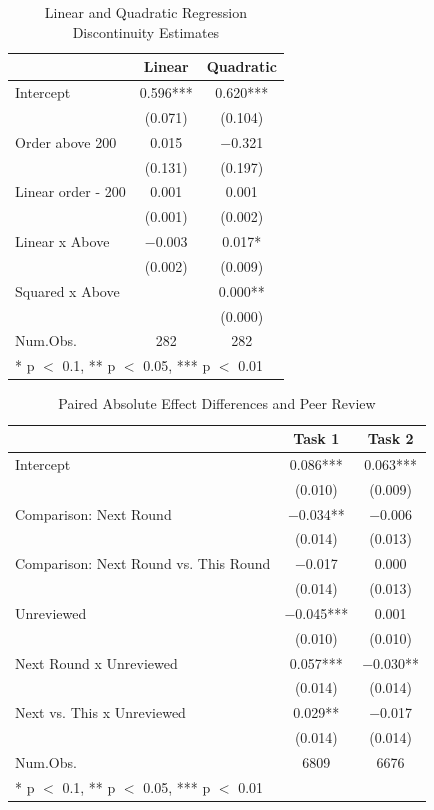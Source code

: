 \documentclass[
  letterpaper,
  DIV=11,
  numbers=noendperiod]{scrartcl}
\begin{document}
\begin{table}
\centering
\caption{Linear and Quadratic Regression Discontinuity Estimates\label{tab-rdd-reg}}
\centering
\begin{tabular}[t]{lcc}
\toprule
  & Linear & Quadratic\\
\midrule
Intercept & \num{0.596}*** & \num{0.620}***\\
 & (\num{0.071}) & (\num{0.104})\\
Order above 200 & \num{0.015} & \num{-0.321}\\
 & (\num{0.131}) & (\num{0.197})\\
Linear order - 200 & \num{0.001} & \num{0.001}\\
 & (\num{0.001}) & (\num{0.002})\\
Linear x Above & \num{-0.003} & \num{0.017}*\\
 & (\num{0.002}) & (\num{0.009})\\
Squared x Above &  & \num{0.000}**\\
 &  & (\num{0.000})\\
\midrule
Num.Obs. & \num{282} & \num{282}\\
\bottomrule
\multicolumn{3}{l}{\rule{0pt}{1em}* p $<$ 0.1, ** p $<$ 0.05, *** p $<$ 0.01}\\
\end{tabular}
\end{table}

\begin{table}
\centering
\caption{Paired Absolute Effect Differences and Peer Review \label{tab-peer-review-reg}}
\centering
\begin{tabular}[t]{lcc}
\toprule
  & Task 1 & Task 2\\
\midrule
Intercept & \num{0.086}*** & \num{0.063}***\\
 & (\num{0.010}) & (\num{0.009})\\
Comparison: Next Round & \num{-0.034}** & \num{-0.006}\\
 & (\num{0.014}) & \vphantom{1} (\num{0.013})\\
Comparison: Next Round vs. This Round & \num{-0.017} & \num{0.000}\\
 & (\num{0.014}) & (\num{0.013})\\
Unreviewed & \num{-0.045}*** & \num{0.001}\\
 & (\num{0.010}) & (\num{0.010})\\
Next Round x Unreviewed & \num{0.057}*** & \num{-0.030}**\\
 & (\num{0.014}) & \vphantom{1} (\num{0.014})\\
Next vs. This x Unreviewed & \num{0.029}** & \num{-0.017}\\
 & (\num{0.014}) & (\num{0.014})\\
\midrule
Num.Obs. & \num{6809} & \num{6676}\\
\bottomrule
\multicolumn{3}{l}{\rule{0pt}{1em}* p $<$ 0.1, ** p $<$ 0.05, *** p $<$ 0.01}\\
\end{tabular}
\end{table}
\end{document}
